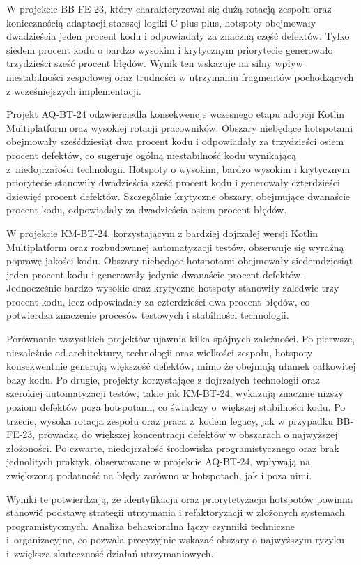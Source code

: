W projekcie BB-FE-23, który charakteryzował się dużą rotacją zespołu oraz koniecznością adaptacji starszej logiki C plus plus, hotspoty obejmowały dwadzieścia jeden procent kodu i odpowiadały za znaczną część defektów. Tylko siedem procent kodu o bardzo wysokim i krytycznym priorytecie generowało trzydzieści sześć procent błędów. Wynik ten wskazuje na silny wpływ niestabilności zespołowej oraz trudności w utrzymaniu fragmentów pochodzących z wcześniejszych implementacji.

Projekt AQ-BT-24 odzwierciedla konsekwencje wczesnego etapu adopcji Kotlin Multiplatform oraz wysokiej rotacji pracowników. Obszary niebędące hotspotami obejmowały sześćdziesiąt dwa procent kodu i odpowiadały za trzydzieści osiem procent defektów, co sugeruje ogólną niestabilność kodu wynikającą z~niedojrzałości technologii. Hotspoty o wysokim, bardzo wysokim i krytycznym priorytecie stanowiły dwadzieścia sześć procent kodu i generowały czterdzieści dziewięć procent defektów. Szczególnie krytyczne obszary, obejmujące dwanaście procent kodu, odpowiadały za dwadzieścia osiem procent błędów.

W projekcie KM-BT-24, korzystającym z bardziej dojrzałej wersji Kotlin Multiplatform oraz rozbudowanej automatyzacji testów, obserwuje się wyraźną poprawę jakości kodu. Obszary niebędące hotspotami obejmowały siedemdziesiąt jeden procent kodu i generowały jedynie dwanaście procent defektów. Jednocześnie bardzo wysokie oraz krytyczne hotspoty stanowiły zaledwie trzy procent kodu, lecz odpowiadały za czterdzieści dwa procent błędów, co potwierdza znaczenie procesów testowych i stabilności technologii.

Porównanie wszystkich projektów ujawnia kilka spójnych zależności. Po pierwsze, niezależnie od architektury, technologii oraz wielkości zespołu, hotspoty konsekwentnie generują większość defektów, mimo że obejmują ułamek całkowitej bazy kodu. Po drugie, projekty korzystające z dojrzałych technologii oraz szerokiej automatyzacji testów, takie jak KM-BT-24, wykazują znacznie niższy poziom defektów poza hotspotami, co świadczy o~większej stabilności kodu. Po trzecie, wysoka rotacja zespołu oraz praca z~kodem legacy, jak w przypadku BB-FE-23, prowadzą do większej koncentracji defektów w obszarach o najwyższej złożoności. Po czwarte, niedojrzałość środowiska programistycznego oraz brak jednolitych praktyk, obserwowane w projekcie AQ-BT-24, wpływają na zwiększoną podatność na błędy zarówno w hotspotach, jak i poza nimi.

Wyniki te potwierdzają, że identyfikacja oraz priorytetyzacja hotspotów powinna stanowić podstawę strategii utrzymania i refaktoryzacji w złożonych systemach programistycznych. Analiza behawioralna łączy czynniki techniczne i~organizacyjne, co pozwala precyzyjnie wskazać obszary o najwyższym ryzyku i~zwiększa skuteczność działań utrzymaniowych.


